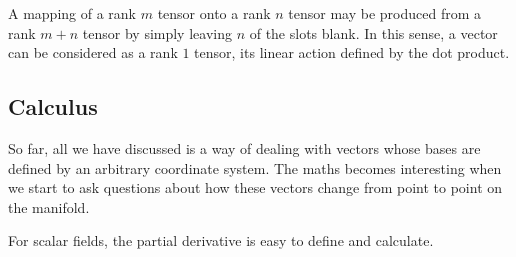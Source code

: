 A mapping of a rank $m$ tensor onto a rank $n$ tensor may be produced from a rank $m+n$ tensor by simply leaving $n$ of the slots blank. In this sense, a vector can be considered as a rank $1$ tensor, its linear action defined by the dot product.

\subsection{Calculus}
So far, all we have discussed is a way of dealing with vectors whose bases are defined by an arbitrary coordinate system. The maths becomes interesting when we start to ask questions about how these vectors change from point to point on the manifold.

For scalar fields, the partial derivative is easy to define and calculate.

